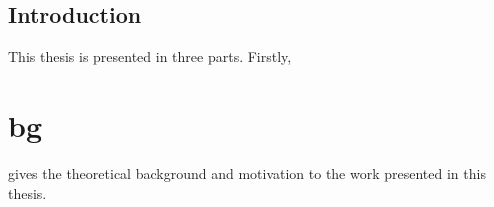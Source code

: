 \graphicspath{{Chapters/Introduction/Figures/}}

\chapter*{Introduction}
\label{chap:Introduction}

This thesis is presented in three parts. Firstly, \part{bg} gives the theoretical background
and motivation to the work presented in this thesis.

